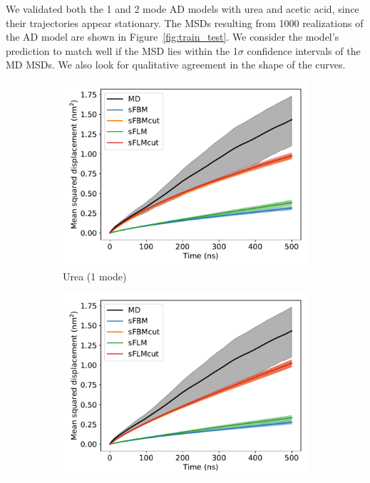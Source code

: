 \documentclass{article}
\begin{document}
  We validated both the 1 and 2 mode AD models with urea and acetic acid, since their
  trajectories appear stationary. The MSDs resulting from 1000 realizations of the AD
  model are shown in Figure~\ref{fig:train_test}. We consider the model's prediction 
  to match well if the MSD lies within the 1$\sigma$ confidence intervals of the MD MSDs.
  We also look for qualitative agreement in the shape of the curves.
  
  \begin{figure}
  \centering
  \begin{subfigure}{0.45\textwidth}
  \includegraphics[width=\textwidth]{1mode_msd_comparison_URE_train_front.pdf}
  \caption{Urea (1 mode)}\label{fig:1mode_msd_comparison_URE_train_front}
  \end{subfigure}
  \begin{subfigure}{0.45\textwidth}
  \includegraphics[width=\textwidth]{2mode_msd_comparison_URE_train_front.pdf}

\end{subfigure}
\end{figure}
\end{document}
